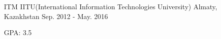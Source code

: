 

\begin{cventries}

  \cventry
    {ITM} %
    {IITU(International Information Technologies University)} %
    {Almaty, Kazakhstan} %
    {Sep. 2012 - May. 2016} %
    {
      \begin{cvitems} %
        \item {GPA: 3.5}
      \end{cvitems}
    }

\end{cventries}
